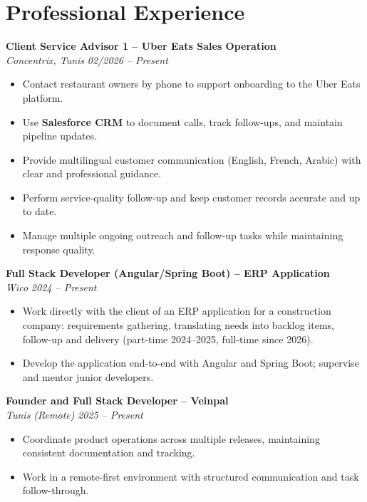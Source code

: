 \documentclass[10pt,a4paper]{article}
\begin{document}
\section*{Professional Experience}
{\small

\textbf{Client Service Advisor 1 -- Uber Eats Sales Operation}\\[1pt]
\textit{Concentrix, Tunis} \hfill \textit{02/2026 -- Present}
\begin{itemize}
  \item Contact restaurant owners by phone to support onboarding to the Uber Eats platform.
  \item Use \textbf{Salesforce CRM} to document calls, track follow-ups, and maintain pipeline updates.
  \item Provide multilingual customer communication (English, French, Arabic) with clear and professional guidance.
  \item Perform service-quality follow-up and keep customer records accurate and up to date.
  \item Manage multiple ongoing outreach and follow-up tasks while maintaining response quality.
\end{itemize}

\vspace{3pt}
\textbf{Full Stack Developer (Angular/Spring Boot) -- ERP Application}\\[1pt]
\textit{Wico} \hfill \textit{2024 -- Present}
\begin{itemize}
  \item Work directly with the client of an ERP application for a construction company: requirements gathering, translating needs into backlog items, follow-up and delivery (part-time 2024--2025, full-time since 2026).
  \item Develop the application end-to-end with Angular and Spring Boot; supervise and mentor junior developers.
\end{itemize}

\vspace{3pt}
\textbf{Founder and Full Stack Developer -- Veinpal}\\[1pt]
\textit{Tunis (Remote)} \hfill \textit{2025 -- Present}
\begin{itemize}
  \item Coordinate product operations across multiple releases, maintaining consistent documentation and tracking.
  \item Work in a remote-first environment with structured communication and task follow-through.
\end{itemize}

}
\end{document}
